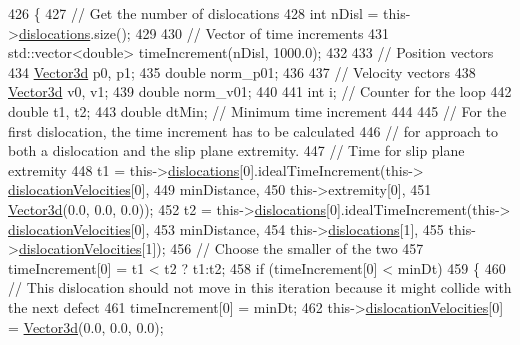 \begin{DoxyCode}
426  \{
427    \textcolor{comment}{// Get the number of dislocations}
428    \textcolor{keywordtype}{int} nDisl = this->\hyperlink{classSlipPlane_ad92c7c409f7e161db449528389180910}{dislocations}.size();
429 
430    \textcolor{comment}{// Vector of time increments}
431    std::vector<double> timeIncrement(nDisl, 1000.0);
432 
433    \textcolor{comment}{// Position vectors}
434    \hyperlink{classVector3d}{Vector3d} p0, p1;
435    \textcolor{keywordtype}{double} norm\_p01;
436 
437    \textcolor{comment}{// Velocity vectors}
438    \hyperlink{classVector3d}{Vector3d} v0, v1;
439    \textcolor{keywordtype}{double} norm\_v01;
440 
441    \textcolor{keywordtype}{int} i;         \textcolor{comment}{// Counter for the loop}
442    \textcolor{keywordtype}{double} t1, t2;
443    \textcolor{keywordtype}{double} dtMin;  \textcolor{comment}{// Minimum time increment}
444 
445    \textcolor{comment}{// For the first dislocation, the time increment has to be calculated}
446    \textcolor{comment}{// for approach to both a dislocation and the slip plane extremity.}
447    \textcolor{comment}{// Time for slip plane extremity}
448    t1 = this->\hyperlink{classSlipPlane_ad92c7c409f7e161db449528389180910}{dislocations}[0].idealTimeIncrement(this->
      \hyperlink{classSlipPlane_a107a3883169bf918664cb4e4fd4bd72c}{dislocationVelocities}[0],
449                                                  minDistance,
450                                                  this->extremity[0],
451                                                  \hyperlink{classVector3d}{Vector3d}(0.0, 0.0, 0.0));
452    t2 = this->\hyperlink{classSlipPlane_ad92c7c409f7e161db449528389180910}{dislocations}[0].idealTimeIncrement(this->
      \hyperlink{classSlipPlane_a107a3883169bf918664cb4e4fd4bd72c}{dislocationVelocities}[0],
453                                                  minDistance,
454                                                  this->\hyperlink{classSlipPlane_ad92c7c409f7e161db449528389180910}{dislocations}[1],
455                                                  this->\hyperlink{classSlipPlane_a107a3883169bf918664cb4e4fd4bd72c}{dislocationVelocities}[1]);
456    \textcolor{comment}{// Choose the smaller of the two}
457    timeIncrement[0] = t1 < t2 ? t1:t2;
458    \textcolor{keywordflow}{if} (timeIncrement[0] < minDt)
459      \{
460        \textcolor{comment}{// This dislocation should not move in this iteration because it might collide with the next defect}
461        timeIncrement[0] = minDt;
462        this->\hyperlink{classSlipPlane_a107a3883169bf918664cb4e4fd4bd72c}{dislocationVelocities}[0] = \hyperlink{classVector3d}{Vector3d}(0.0, 0.0, 0.0);

\end{DoxyCode}
